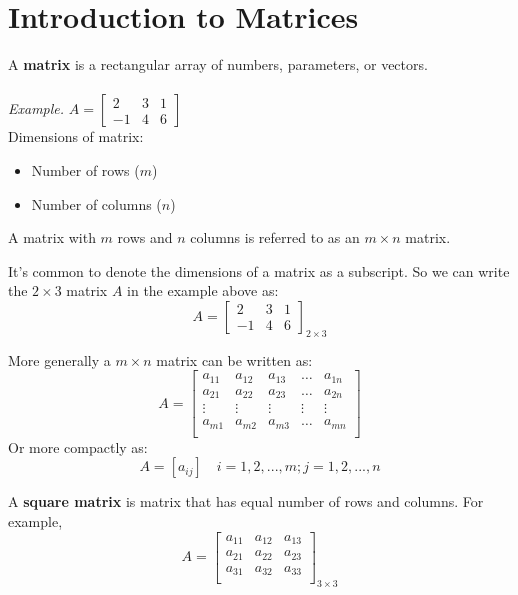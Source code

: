 \documentclass{./../Latex/handout}
\begin{document}
\thispagestyle{plain}
\newcommand{\mytitle}{Linear Algebra}
\myheader{\mytitle}

\section{Introduction to Matrices}
A \textbf{matrix} is a rectangular array of numbers, parameters, or vectors. \\~\\
\textit{Example.} $A = \begin{bmatrix}
2 & 3 & 1 \\
-1 &4 & 6
\end{bmatrix}$ \\

Dimensions of matrix:
\begin{itemize}
\item Number of rows ($m$)
\item Number of columns ($n$)
\end{itemize}
A matrix with $m$ rows and $n$ columns is referred to as an $m \times n$ matrix. 

It's common to denote the dimensions of a matrix as a subscript. So we can write the $ 2 \times 3$ matrix $A$ in the example above as:
  $$A = \begin{bmatrix}
2 & 3 & 1 \\
-1 &4 & 6
\end{bmatrix}_{2 \times 3}$$

More generally a $m \times n$ matrix can be written as:
$$A = \begin{bmatrix}
a_{11} & a_{12} & a_{13} & \hdots & a_{1n} \\
a_{21} & a_{22} & a_{23} & \hdots & a_{2n} \\
\vdots & \vdots & \vdots & \vdots & \vdots \\
a_{m1} & a_{m2} & a_{m3} & \hdots & a_{mn} \\
\end{bmatrix}$$
Or more compactly as:
$$ A = [ a_{ij} ] \quad i=1,2,...,m; j=1,2,...,n$$ 

A \textbf{square matrix} is matrix that has equal number of rows and columns. For example,
$$A = \begin{bmatrix}
a_{11} & a_{12} & a_{13} \\
a_{21} & a_{22} & a_{23} \\
a_{31} & a_{32} & a_{33} \\
\end{bmatrix}_{3\times 3}$$
\end{document}
